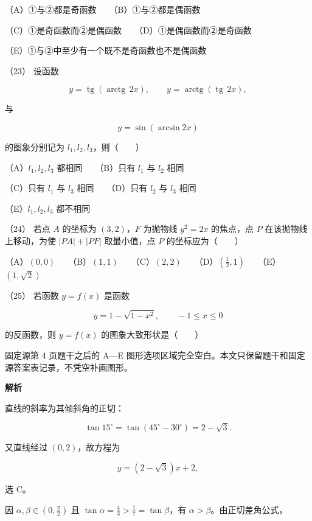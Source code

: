 \begin{answer}
（A）①与②都是奇函数　　（B）①与②都是偶函数

（C）①是奇函数而②是偶函数　　（D）①是偶函数而②是奇函数

（E）①与②中至少有一个既不是奇函数也不是偶函数

（23） 设函数

\nopagebreak[4]
\[
y=\operatorname{tg}(\operatorname{arctg}\,2x),\qquad
y=\operatorname{arctg}(\operatorname{tg}\,2x),
\]

与

\nopagebreak[4]
\[
y=\sin(\arcsin 2x)
\]

的图象分别记为 $l_1,l_2,l_3$，则\mbox{（　　）}

（A）$l_1,l_2,l_3$ 都相同　　（B）只有 $l_1$ 与 $l_2$ 相同

（C）只有 $l_1$ 与 $l_3$ 相同　　（D）只有 $l_2$ 与 $l_3$ 相同

（E）$l_1,l_2,l_3$ 都不相同

（24） 若点 $A$ 的坐标为 $(3,2)$，$F$ 为抛物线 $y^2=2x$ 的焦点，点 $P$ 在该抛物线上移动，为使 $|PA|+|PF|$ 取最小值，点 $P$ 的坐标应为\mbox{（　　）}

（A）$(0,0)$　　（B）$(1,1)$　　（C）$(2,2)$　　（D）$(\frac12,1)$　　（E）$(1,\sqrt2)$

（25） 若函数 $y=f(x)$ 是函数

\nopagebreak[4]
\[
y=1-\sqrt{1-x^2},\qquad -1\le x\le0
\]

的反函数，则 $y=f(x)$ 的图象大致形状是\mbox{（　　）}

\begin{gktip}
固定源第 4 页题干之后的 A—E 图形选项区域完全空白。本文只保留题干和固定源答案表记录，不凭空补画图形。
\end{gktip}

\textbf{解析}


直线的斜率为其倾斜角的正切：

\nopagebreak[4]
\[
\tan15^\circ=\tan(45^\circ-30^\circ)=2-\sqrt3.
\]

又直线经过 $(0,2)$，故方程为

\nopagebreak[4]
\[
y=(2-\sqrt3)x+2,
\]

选 C。


因 $\alpha,\beta\in(0,\frac\pi2)$ 且 $\tan\alpha=\frac43>\frac17=\tan\beta$，有 $\alpha>\beta$。由正切差角公式，


\end{answer}

